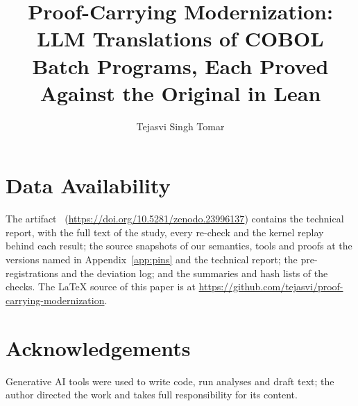 \documentclass[acmsmall,screen,nonacm]{acmart}
\begin{document}
\title{Proof-Carrying Modernization: LLM Translations of COBOL Batch Programs, Each Proved Against the Original in Lean}

\author{Tejasvi Singh Tomar}
\email{}

\begin{abstract}

\end{abstract}

\maketitle











\section*{Data Availability}
The artifact~\cite{fvtechreport} (\url{https://doi.org/10.5281/zenodo.23996137}) contains the technical report, with
the full text of the study, every re-check and the kernel replay behind each result; the source snapshots of our
semantics, tools and proofs at the versions named in Appendix~\ref{app:pins} and the technical report; the pre-registrations and the deviation log; and the summaries and hash lists of the checks. The LaTeX source of this paper
is at \url{https://github.com/tejasvi/proof-carrying-modernization}.

\section*{Acknowledgements}
Generative AI tools were used to write code, run analyses and draft text; the author directed the work and takes full
responsibility for its content.




\appendix

\end{document}
